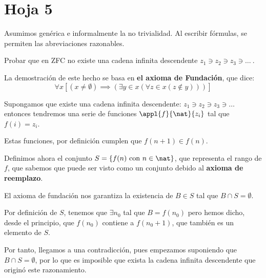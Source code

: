 \section{Hoja 5}

Asumimos gen\'erica e informalmente la no trivialidad. Al escribir f\'ormulas, se permiten
las abreviaciones razonables. 

\begin{problem} 
Probar que en ZFC no existe una cadena infinita descendente $z_1 \ni z_2 \ni z_3 \ni \dots \ $.

\solution

La demostración de este hecho se basa en \textbf{el axioma de Fundación}, que dice:
\[\forall x \left[(x\neq \emptyset)\implies (\exists y \in x (\forall z \in x (z\notin y)))\right]\]

Supongamos que existe una cadena infinita descendente: $z_1 \ni z_2 \ni z_3 \ni \dots \ $ entonces tendremos una serie de funciones $\appl{f}{\nat}{z_i}$ tal que $f(i)=z_i$.

Estas funciones, por definición cumplen que $f(n+1) \in f(n)$.

Definimos ahora el conjunto $S=\{f(n) \text{ con } n\in \nat \}$, que representa el rango de $f$, que sabemos que puede ser visto como un conjunto debido al \textbf{axioma de reemplazo}.

El axioma de fundación nos garantiza la existencia de $B \in S$ tal que $B \cap S = \emptyset$. 

Por definición de $S$, tenemos que $\exists n_0$ tal que $B=f(n_0)$ pero hemos dicho, desde el principio, que $f(n_0)$ contiene a $f(n_0+1)$, que también es un elemento de $S$.

Por tanto, llegamos a una contradicción, pues empezamos suponiendo que $B \cap S = \emptyset$, por lo que es imposible que exista la cadena infinita descendente que originó este razonamiento.

\end{problem}


